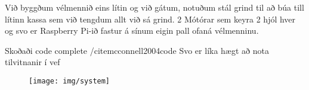 Við byggðum vélmennið eins lítin og við gátum, notuðum stál grind til að búa till lítinn kassa sem við tengdum allt við sá grind. 2 Mótórar sem keyra 2 hjól hver og svo er Raspberry Pi-ið fastur á sínum eigin pall ofaná vélmenninu.

Skoðaði code complete /cite{mcconnell2004code}
Svo er líka hægt að nota tilvitnanir í vef \cite{WinNT}
\begin{figure}[h]
\texttt{[image: img/system]}
\end{figure}